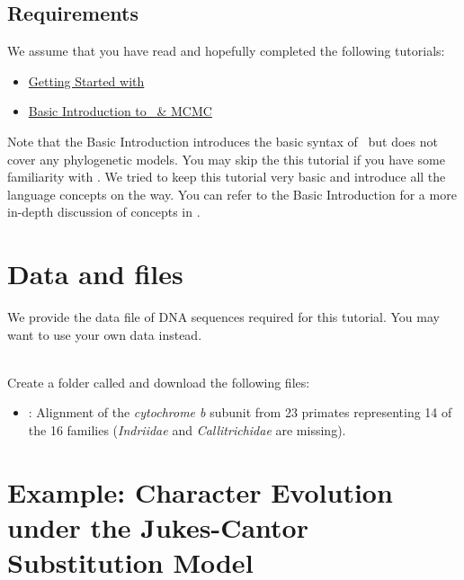 \subsection*{Requirements}
We assume that you have read and hopefully completed the following tutorials:
\begin{itemize}
\item \href{https://github.com/revbayes/revbayes_tutorial/raw/master/tutorial_TeX/RB_Getting_Started/RB_Getting_Started.pdf}{Getting Started with \RevBayes}
\item \href{https://github.com/revbayes/revbayes_tutorial/raw/master/tutorial_TeX/RB_Basics_Tutorial/RB_Basics_Tutorial.pdf}{Basic Introduction to \Rev~\& MCMC}
\end{itemize}
Note that the Basic Introduction introduces the basic syntax of \Rev~but does not cover any phylogenetic models.
You may skip the this tutorial if you have some familiarity with \R.
We tried to keep this tutorial very basic and introduce all the language concepts on the way.
You can refer to the Basic Introduction for a more in-depth discussion of concepts in \Rev.


\section{Data and files}

We provide the data file of DNA sequences required for this tutorial.
You may want to use your own data instead.

\noindent \\ \impmark Create a folder called  and download the following files:
\begin{itemize}
\item \href{http://rawgit.com/revbayes/revbayes_tutorial/master/RB_CTMC_Tutorial/data/primates_cytb.nex}{}: Alignment of the \textit{cytochrome b} subunit from 23 primates representing 14 of the 16 families (\textit{Indriidae} and \textit{Callitrichidae} are missing).
\end{itemize}



%
%
\FloatBarrier
\bigskip
\section{Example: Character Evolution under the Jukes-Cantor Substitution Model}

